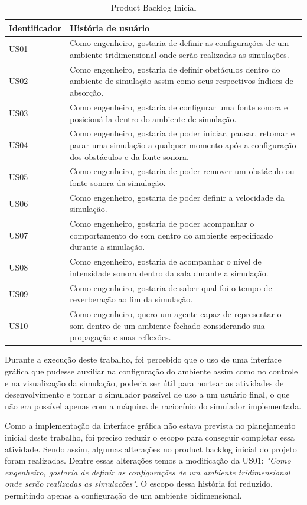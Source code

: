 \begin{table}[!htb]
\centering
\begin{tabular}{|p{4cm}|p{10cm}|}\hline
Identificador & História de usuário\\ \hline
US01 & Como engenheiro, gostaria de definir as configurações de um ambiente tridimensional onde serão realizadas as simulações.\\ \hline
US02 & Como engenheiro, gostaria de definir obstáculos dentro do ambiente de simulação assim como seus respectivos índices de absorção. \\ \hline
US03 & Como engenheiro, gostaria de configurar uma fonte sonora e posicioná-la dentro do ambiente de simulação.\\ \hline
US04 & Como engenheiro, gostaria de poder iniciar, pausar, retomar e parar uma simulação a qualquer momento após a configuração dos obstáculos e da fonte sonora. \\ \hline
US05 & Como engenheiro, gostaria de poder remover um obstáculo ou fonte sonora da simulação.\\ \hline
US06 & Como engenheiro, gostaria de poder definir a velocidade da simulação. \\ \hline
US07 & Como engenheiro, gostaria de poder acompanhar o comportamento do som dentro do ambiente especificado durante a simulação.\\ \hline
US08 & Como engenheiro, gostaria de acompanhar o nível de intensidade sonora dentro da sala durante a simulação.\\ \hline
US09 & Como engenheiro, gostaria de saber qual foi o tempo de reverberação ao fim da simulação.\\ \hline
US10 & Como engenheiro, quero um agente capaz de representar o som dentro de um ambiente fechado considerando sua propagação e suas reflexões.\\ \hline

\end{tabular}
\caption{Product Backlog Inicial}\label{backlog_inicial}
\end{table}

Durante a execução deste trabalho, foi percebido que o uso de uma interface gráfica que pudesse auxiliar na configuração do ambiente assim como no controle e na visualização da simulação, poderia ser útil para nortear as atividades de desenvolvimento e tornar o simulador passível de uso a um usuário final, o que não era possível apenas com a máquina de raciocínio do simulador implementada. 

Como a implementação da interface gráfica não estava prevista no planejamento inicial deste trabalho, foi preciso reduzir o escopo para conseguir completar essa atividade. Sendo assim, algumas alterações no product backlog inicial do projeto foram realizadas. Dentre essas alterações temos a modificação da US01: \textit{"Como engenheiro, gostaria de definir as configurações de um ambiente tridimensional onde serão realizadas as simulações"}. O escopo dessa história foi reduzido, permitindo apenas a configuração de um ambiente bidimensional.

